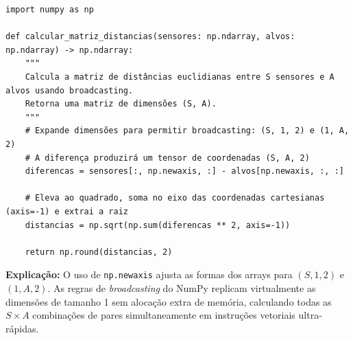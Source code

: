 \ifmostrarGabarito
\begin{verbatim}
import numpy as np

def calcular_matriz_distancias(sensores: np.ndarray, alvos: np.ndarray) -> np.ndarray:
    """
    Calcula a matriz de distâncias euclidianas entre S sensores e A alvos usando broadcasting.
    Retorna uma matriz de dimensões (S, A).
    """
    # Expande dimensões para permitir broadcasting: (S, 1, 2) e (1, A, 2)
    # A diferença produzirá um tensor de coordenadas (S, A, 2)
    diferencas = sensores[:, np.newaxis, :] - alvos[np.newaxis, :, :]
    
    # Eleva ao quadrado, soma no eixo das coordenadas cartesianas (axis=-1) e extrai a raiz
    distancias = np.sqrt(np.sum(diferencas ** 2, axis=-1))
    
    return np.round(distancias, 2)
\end{verbatim}

\textbf{Explicação:}
O uso de \texttt{np.newaxis} ajusta as formas dos arrays para $(S, 1, 2)$ e $(1, A, 2)$. As regras de \emph{broadcasting} do NumPy replicam virtualmente as dimensões de tamanho 1 sem alocação extra de memória, calculando todas as $S \times A$ combinações de pares simultaneamente em instruções vetoriais ultra-rápidas.
\fi
